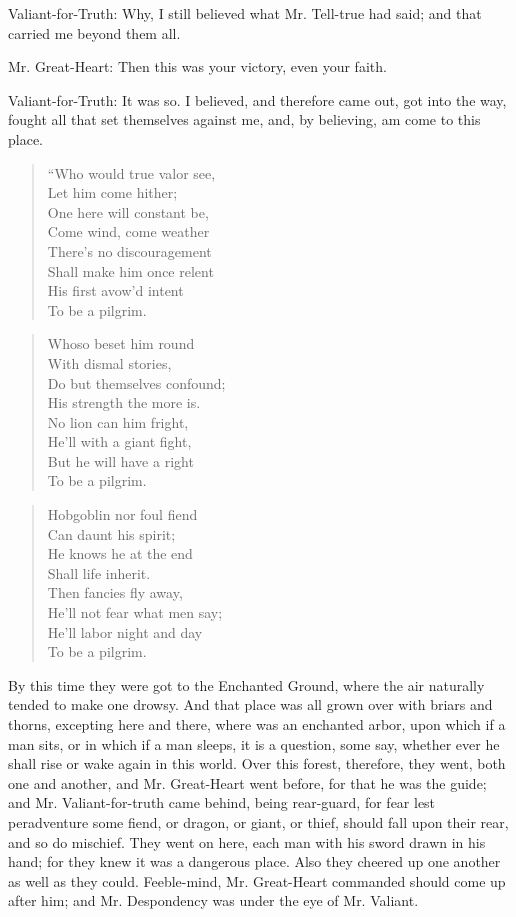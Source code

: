Valiant-for-Truth: Why, I still believed what Mr. Tell-true had said; and that carried me beyond them all.

Mr. Great-Heart: Then this was your victory, even your faith.

Valiant-for-Truth: It was so. I believed, and therefore came out, got into the way, fought all that set themselves against me, and, by believing, am come to this place.
\begin{verse}
 ``Who would true valor see,\\
Let him come hither;\\
One here will constant be,\\
Come wind, come weather\\
There's no discouragement\\
Shall make him once relent\\
His first avow'd intent\\
To be a pilgrim.\\
\end{verse}
\begin{verse}
Whoso beset him round\\
With dismal stories,\\
Do but themselves confound;\\
His strength the more is.\\
No lion can him fright,\\
He'll with a giant fight,\\
But he will have a right\\
To be a pilgrim.\\
\end{verse}
\begin{verse}
 Hobgoblin nor foul fiend\\
Can daunt his spirit;\\
He knows he at the end\\
Shall life inherit.\\
Then fancies fly away,\\
He'll not fear what men say;\\
He'll labor night and day\\
To be a pilgrim.\\
\end{verse}

By this time they were got to the Enchanted Ground, where the air naturally tended to make one drowsy. And that place was all grown over with briars and thorns, excepting here and there, where was an enchanted arbor, upon which if a man sits, or in which if a man sleeps, it is a question, some say, whether ever he shall rise or wake again in this world. Over this forest, therefore, they went, both one and another, and Mr. Great-Heart went before, for that he was the guide; and Mr. Valiant-for-truth came behind, being rear-guard, for fear lest peradventure some fiend, or dragon, or giant, or thief, should fall upon their rear, and so do mischief. They went on here, each man with his sword drawn in his hand; for they knew it was a dangerous place. Also they cheered up one another as well as they could. Feeble-mind, Mr. Great-Heart commanded should come up after him; and Mr. Despondency was under the eye of Mr. Valiant.

